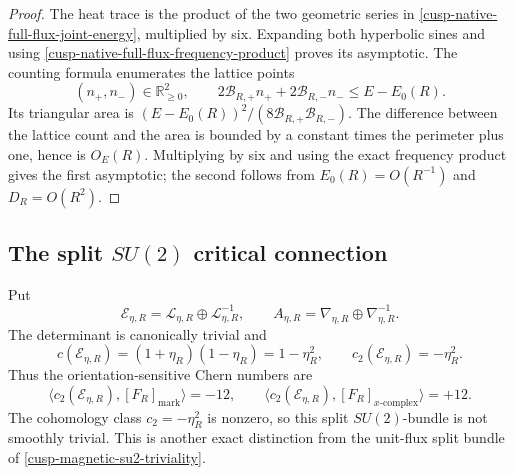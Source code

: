 \begin{proof}
The heat trace is the product of the two geometric series in
\cref{cusp-native-full-flux-joint-energy}, multiplied by six.  Expanding both
hyperbolic sines and using
\cref{cusp-native-full-flux-frequency-product} proves its asymptotic.
The counting formula enumerates the lattice points
\[
 (n_+,n_-)\in\mathbb R_{\ge0}^2,
 \qquad
 2\mathcal B_{R,+}n_++2\mathcal B_{R,-}n_-
 \le E-E_0(R).
\]
Its triangular area is
\((E-E_0(R))^2/(8\mathcal B_{R,+}\mathcal B_{R,-})\).  The difference
between the lattice count and the area is bounded by a constant times the
perimeter plus one, hence is \(O_E(R)\).  Multiplying by six and using the
exact frequency product gives the first asymptotic; the second follows from
\(E_0(R)=O(R^{-1})\) and \(D_R=O(R^2)\).
\end{proof}

\subsection{The split \texorpdfstring{\(SU(2)\)}{SU(2)} critical connection}

Put
\begin{equation}
 \mathscr E_{\eta,R}=\mathscr L_{\eta,R}\oplus
 \mathscr L_{\eta,R}^{-1},
 \qquad
 A_{\eta,R}=\nabla_{\eta,R}\oplus\nabla_{\eta,R}^{-1}.
 \label{cusp-native-full-flux-split-bundle-connection}
\end{equation}
The determinant is canonically trivial and
\begin{equation}
 c(\mathscr E_{\eta,R})=(1+\eta_R)(1-\eta_R)=1-\eta_R^2,
 \qquad c_2(\mathscr E_{\eta,R})=-\eta_R^2.
 \label{cusp-native-full-flux-Chern-class}
\end{equation}
Thus the orientation-sensitive Chern numbers are
\begin{equation}
 \langle c_2(\mathscr E_{\eta,R}),[F_R]_{\mathrm{mark}}\rangle=-12,
 \qquad
 \langle c_2(\mathscr E_{\eta,R}),
 [F_R]_{x\text{-}\mathrm{complex}}\rangle=+12.
 \label{cusp-native-full-flux-Chern-numbers}
\end{equation}
The cohomology class \(c_2=-\eta_R^2\) is nonzero, so this split
\(SU(2)\)-bundle is not smoothly trivial.  This is another exact distinction
from the unit-flux split bundle of \cref{cusp-magnetic-su2-triviality}.

